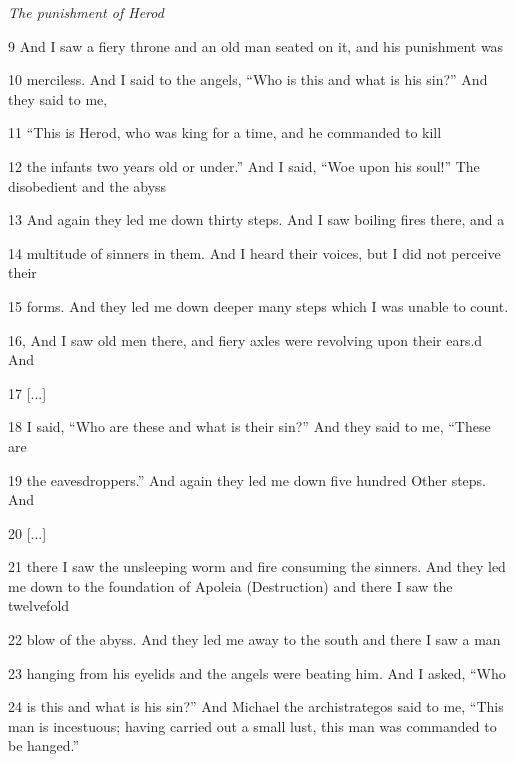 \par \textit{The punishment of Herod}

\par 9 And I saw a fiery throne and an old man seated on it, and his punishment was

\par 10 merciless. And I said to the angels, “Who is this and what is his sin?” And they said to me, 

\par 11 “This is Herod, who was king for a time, and he commanded to kill

\par 12 the infants two years old or under.” And I said, “Woe upon his soul!” The disobedient and the abyss

\par 13 And again they led me down thirty steps. And I saw boiling fires there, and a

\par 14 multitude of sinners in them. And I heard their voices, but I did not perceive their

\par 15 forms. And they led me down deeper many steps which I was unable to count.

\par 16, And I saw old men there, and fiery axles were revolving upon their ears.d And

\par 17 [...]

\par 18 I said, “Who are these and what is their sin?” And they said to me, “These are

\par 19 the eavesdroppers.” And again they led me down five hundred Other steps. And

\par 20 [...]

\par 21 there I saw the unsleeping worm and fire consuming the sinners. And they led me down to the foundation of Apoleia (Destruction) and there I saw the twelvefold

\par 22 blow of the abyss. And they led me away to the south and there I saw a man

\par 23 hanging from his eyelids and the angels were beating him. And I asked, “Who

\par 24 is this and what is his sin?” And Michael the archistrategos said to me, “This man is incestuous; having carried out a small lust, this man was commanded to be hanged.”

